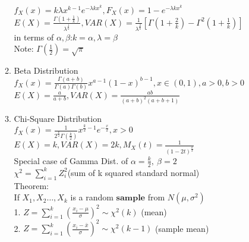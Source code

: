 \documentclass[10pt]{article}
\begin{document}
\begin{multicols}{2}
\begin{enumerate}
\begin{enumerate}
				$f_X(x) = k\lambda x^{k-1}e^{-\lambda kx^k}, F_X(x) = 1 - e^{-\lambda kx^k}$\\
				$E(X) = \frac{\Gamma(1+\frac{1}{k})}{\lambda^{\frac{1}{k}}}, VAR(X) = \frac{1}{\lambda^{\frac{2}{k}}}[\Gamma(1+\frac{2}{k}) - \Gamma^2(1+\frac{1}{k})]$\\
				in terms of $\alpha, \beta$:$k = \alpha, \lambda = \beta$\\
				Note: $\Gamma(\frac{1}{2}) = \sqrt{\pi}$
				\item Beta Distribution\\
				$f_X(x) = \frac{\Gamma(a + b)}{\Gamma(a)\Gamma(b)}x^{a-1}(1-x)^{b-1}, x \in (0,1), a>0, b>0$\\
				$E(X) = \frac{a}{a+b}, VAR(X) = \frac{ab}{(a+b)^2(a+b+1)}$
				\item Chi-Square Distribution\\
				$f_X(x) = \frac{1}{2^{\frac{k}{2}}\Gamma(\frac{k}{2})}x^{\frac{k}{2}-1}e^{-\frac{x}{2}}, x > 0$\\
				$E(X) = k, VAR(X) = 2k, M_X(t) = \frac{1}{(1-2t)^{\frac{k}{2}}}$\\
				Special case of Gamma Dist. of $\alpha = \frac{k}{2}, \ \beta = 2$\\
				$\chi^2 = \sum_{i = 1}^{k}Z_i^2$(sum of k squared standard normal)\\
				Theorem:\\
				If $X_1, X_2 \dots, X_k$ is a random $\textbf{sample}$ from $N(\mu, \sigma^2)$\\
				1. $Z = \sum_{i = 1}^{k}(\frac{x_i-\mu}{\sigma})^2 \sim \chi^2(k)$ (mean)\\
				2. $Z = \sum_{i = 1}^{k}(\frac{x_i-\bar x}{\sigma})^2 \sim \chi^2(k-1)$ (sample mean)\\
			\end{enumerate}
			

\end{enumerate}
\end{multicols}
\end{document}
